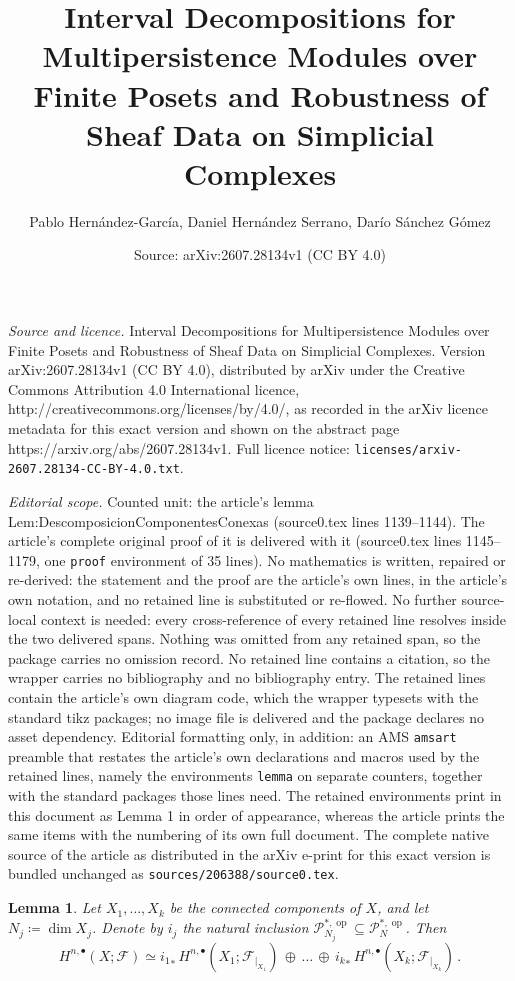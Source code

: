 \documentclass[10pt,a4paper]{amsart}
\title{Interval Decompositions for Multipersistence Modules over Finite Posets and Robustness of Sheaf Data on Simplicial Complexes}
\author{Pablo Hern\'andez-Garc\'ia, Daniel Hern\'andez Serrano, Dar\'io S\'anchez G\'omez}
\date{Source: arXiv:2607.28134v1 (CC BY 4.0)}
\newtheorem{lemma}{Lemma}
\newcommand{\cF}{{\mathcal F}}
\newcommand{\cP}{\mathcal{P}}
\DeclareMathOperator{\op}{op}
\begin{document}
\maketitle

\noindent\emph{Source and licence.} Interval Decompositions for Multipersistence Modules over Finite Posets and Robustness of Sheaf Data on Simplicial Complexes. Version arXiv:2607.28134v1 (CC BY 4.0), distributed by arXiv under the Creative Commons Attribution 4.0 International licence, http://creativecommons.org/licenses/by/4.0/, as recorded in the arXiv licence metadata for this exact version and shown on the abstract page https://arxiv.org/abs/2607.28134v1. Full licence notice: \texttt{licenses/arxiv-2607.28134-CC-BY-4.0.txt}.\par\smallskip

\noindent\textit{Editorial scope.} Counted unit: the article's lemma Lem:DescomposicionComponentesConexas (source0.tex lines 1139--1144). The article's complete original proof of it is delivered with it (source0.tex lines 1145--1179, one \texttt{proof} environment of 35 lines). No mathematics is written, repaired or re-derived: the statement and the proof are the article's own lines, in the article's own notation, and no retained line is substituted or re-flowed.  No further source-local context is needed: every cross-reference of every retained line resolves inside the two delivered spans.  Nothing was omitted from any retained span, so the package carries no omission record.  No retained line contains a citation, so the wrapper carries no bibliography and no bibliography entry.  The retained lines contain the article's own diagram code, which the wrapper typesets with the standard tikz packages; no image file is delivered and the package declares no asset dependency.  Editorial formatting only, in addition: an AMS \texttt{amsart} preamble that restates the article's own declarations and macros used by the retained lines, namely the environments \texttt{lemma} on separate counters, together with the standard packages those lines need.  The retained environments print in this document as Lemma 1 in order of appearance, whereas the article prints the same items with the numbering of its own full document.  The complete native source of the article as distributed in the arXiv e-print for this exact version is bundled unchanged as \texttt{sources/206388/source0.tex}.
\begin{lemma}\label{Lem:DescomposicionComponentesConexas}
    Let $X_1,\dots,X_k$ be the connected components of $X$, and let $N_j\coloneqq \dim X_{j}$. Denote by $i_j$ the natural inclusion $\cP_{N_j}^{*,\op}\subseteq \cP^{*,\op}_N$. Then
    \begin{equation*}
        H^{n,\bullet}(X;\cF)\simeq {i_{1}}_*\,H^{n,\bullet}(X_1;\cF_{|_{X_1}})\,\oplus\,\dots\, \oplus\, {i_k}_*\,H^{n,\bullet}(X_k;\cF_{|_{X_k}})\, .
    \end{equation*}
\end{lemma}
\end{document}
